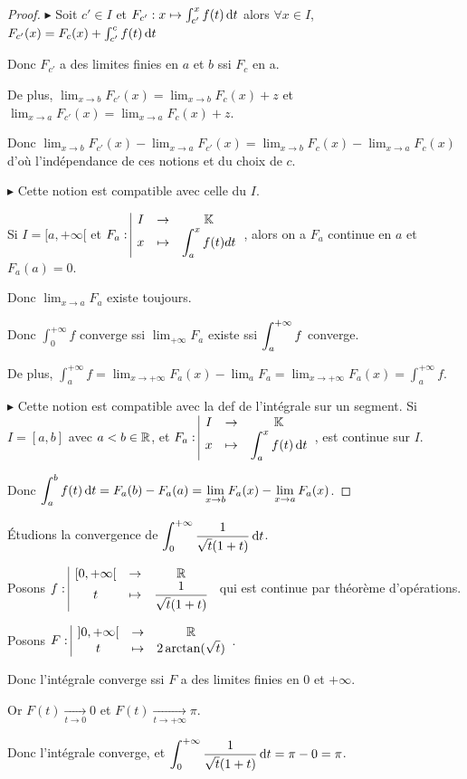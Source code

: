 \begin{proof}
    $\blacktriangleright$ Soit $c' \in I$ et $F_{c'} : x \mapsto \int_{c' }^{x } f(t) \,\mathrm{d}t$ alors 
    $\forall x \in I$, $F_{c'}(x) = F_c(x) + \int_{c'}^{c} f(t) \,\mathrm{d}t$ 

    Donc $F_{c'}$ a des limites finies en $a$ et $b$ ssi $F_c$ en a. 

    De plus, $\lim_{x \to b} F_{c'}(x) = \lim_{x \to b} F_c(x)  + z$ et 
    $\lim_{x \to a} F_{c'}(x) = \lim_{x \to a} F_c(x) + z$. 

    Donc $\lim_{x \to b} F_{c'}(x) - \lim_{x \to a} F_{c'}(x) = \lim_{x \to b} F_c(x) - \lim_{x \to a} F_c(x)$
    d'où l'indépendance de ces notions et du choix de $c$. 

    \lvspace $\blacktriangleright$ Cette notion est compatible avec celle du $I$. 

    Si $I =[a, + \infty[$ et $F_a: \space \begin{array}{|ccc} \displaystyle I & \to & \displaystyle \mathbb{K} \\ \displaystyle x & \mapsto & \displaystyle \int_a^x f(t) dt \end{array}$, alors on a 
    $F_a$ continue en $a$ et $F_a(a) = 0 $.
    
    Donc $\lim_{x \to a} F_a$ existe toujours. 

    Donc $\int_{0}^{+ \infty   } f$ converge ssi $\lim_{+\infty   } F_a$ existe ssi 
    $\displaystyle \int_{a }^{+ \infty   } f$ converge.

    De plus, $\int_{a }^{+ \infty   } f = \lim_{x \to + \infty   } F_a(x) - \lim_{a } F_a = \lim_{x \to + \infty  } F_a(x) = \int_{a }^{+ \infty   } f$.


    \lvspace $\blacktriangleright$ Cette notion est compatible avec la def de l'intégrale sur un segment. 
    Si $I = [a, b]$ avec $a < b \in \mathbb{R}$, et $F_a: \space \begin{array}{|ccc} \displaystyle I & \to & \displaystyle \mathbb{K} \\ \displaystyle x & \mapsto & \displaystyle \int_a^x f(t) \,\mathrm{d}t \end{array}$, 
    est continue sur $I$.

    Donc $\displaystyle \int_{a }^{b } f(t) \,\mathrm{d}t = F_a(b) - F_a(a) = \lim_{x \to b} F_a(x) - \lim_{x \to a} F_a(x)$.
\end{proof}

\begin{exemple}
    Étudions la convergence de $\displaystyle \int_0^{+ \infty} \frac 1 {\sqrt t (1 + t)} \,\mathrm{d}t$.

    Posons $f: \space \begin{array}{|ccc} \displaystyle [0, + \infty[ & \to & \displaystyle \mathbb{R} \\ \displaystyle t & \mapsto & \displaystyle \frac 1 {\sqrt t (1 + t)} \end{array}$ qui est continue par théorème d'opérations.

    Posons $F: \space \begin{array}{|ccc} \displaystyle ]0, + \infty[ & \to & \displaystyle \mathbb{R} \\ \displaystyle t & \mapsto & \displaystyle 2 \arctan(\sqrt t) \end{array}$.

    Donc l'intégrale converge ssi $F$ a des limites finies en $0$ et $+\infty$.

    Or $F(t) \xrightarrow[t \to 0   ]{} 0$ et $F(t) \xrightarrow[t \to + \infty   ]{} \pi$.

    Donc l'intégrale converge, et $\displaystyle \int_{0}^{+ \infty   } \frac 1 {\sqrt t (1 + t)} \,\mathrm{d}t = \pi - 0 = \pi$.
\end{exemple}


